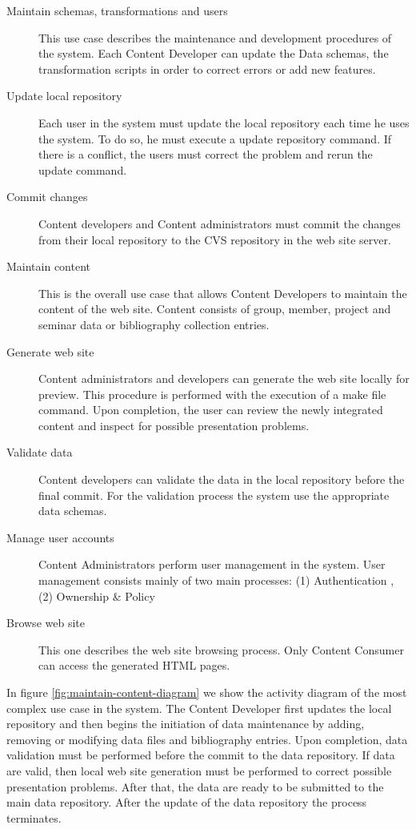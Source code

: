 \documentclass[10pt]{article}
\begin{document}
\begin{description}
\item[Maintain schemas, transformations and users] This use case describes the 
maintenance and development procedures of the system. Each Content Developer can
update the Data schemas, the transformation scripts in order to correct errors 
or add new features.

\item[Update local repository] Each user in the system must update the local 
repository each time he uses the system. To do so, he must execute a  update 
repository command. If there is a conflict, the users must correct the problem 
and rerun the update command.

\item[Commit changes] Content developers and Content administrators must commit 
the changes from their local repository to the {\sc CVS} repository in the web site server.

\item[Maintain content] This is the overall use case that allows Content 
Developers to maintain the content of the web site. 
Content consists of  group, member, project and seminar data or bibliography 
collection entries.

\item[Generate web site] Content administrators and developers can generate the 
web site locally for preview. This procedure is 
performed with the execution of a make file command. Upon completion, 
the user can review the newly integrated content and inspect 
for possible presentation problems.

\item[Validate data] Content developers can validate the data in the local 
repository before the final commit. For the validation process
the system use the appropriate data schemas.

\item[Manage user accounts] Content Administrators perform user management in the 
system. User management consists mainly of two main processes: 
(1) Authentication , (2) Ownership \& Policy

\item[Browse web site] This one describes the web site browsing process. Only 
Content Consumer can access the generated {\sc HTML} pages.

\end{description} 

In figure \ref{fig:maintain-content-diagram} we show the activity diagram of the 
most complex use case in the system. The Content Developer first updates the 
local repository and then begins the initiation of data maintenance by adding, 
removing or modifying data files and bibliography entries. Upon completion, data 
validation must be performed before the commit to the data repository. If data 
are valid, then local web site generation must be performed to correct possible 
presentation problems. After that, the data are ready to be submitted to the main 
data repository. After the update of the data repository the process terminates.
\end{document}
